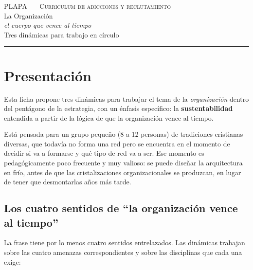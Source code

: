 \documentclass[11pt, a4paper]{article}
\begin{document}

\thispagestyle{plain}
\begin{center}
  \vspace*{1.5em}
  {\color{tenue}\scshape\small PLAPA \ \textbullet\ \ Curriculum de adicciones y reclutamiento}\\
  \vspace{2em}
  {\color{organizacionVerde}\Huge La Organización}\\[0.35em]
  {\color{tinte}\LARGE\itshape el cuerpo que vence al tiempo}\\
  \vspace{1.4em}
  {\color{tenue}\large Tres dinámicas para trabajo en círculo}\\
  \vspace{0.6em}
  {\color{regla}\rule{0.35\linewidth}{0.5pt}}
\end{center}

\vspace{2em}

\section*{Presentación}

Esta ficha propone tres dinámicas para trabajar el tema de la \emph{organización} dentro del pentágono de la estrategia, con un énfasis específico: la \textbf{sustentabilidad} entendida a partir de la lógica de que la organización vence al tiempo.

Está pensada para un grupo pequeño (8 a 12 personas) de tradiciones cristianas diversas, que todavía no forma una red pero se encuentra en el momento de decidir si va a formarse y qué tipo de red va a ser. Ese momento es pedagógicamente poco frecuente y muy valioso: se puede diseñar la arquitectura en frío, antes de que las cristalizaciones organizacionales se produzcan, en lugar de tener que desmontarlas años más tarde.

\subsection*{Los cuatro sentidos de ``la organización vence al tiempo''}

La frase tiene por lo menos cuatro sentidos entrelazados. Las dinámicas trabajan sobre las cuatro amenazas correspondientes y sobre las disciplinas que cada una exige:
\end{document}
